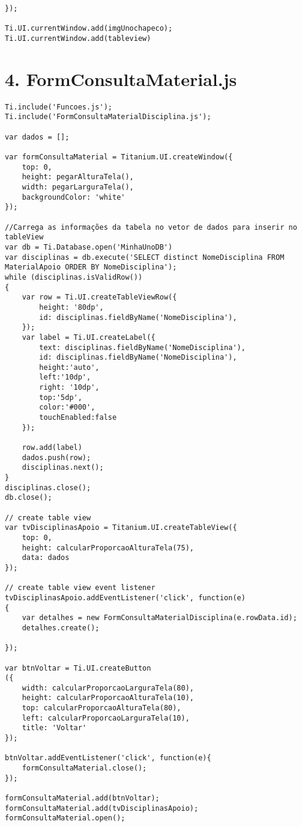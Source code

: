 \begin{lstlisting}
});

Ti.UI.currentWindow.add(imgUnochapeco);
Ti.UI.currentWindow.add(tableview)
\end{lstlisting}

\section*{4. FormConsultaMaterial.js}
\begin{lstlisting}
Ti.include('Funcoes.js');
Ti.include('FormConsultaMaterialDisciplina.js');

var dados = [];

var formConsultaMaterial = Titanium.UI.createWindow({
	top: 0,
	height: pegarAlturaTela(),
	width: pegarLarguraTela(),
	backgroundColor: 'white'
});

//Carrega as informações da tabela no vetor de dados para inserir no tableView
var db = Ti.Database.open('MinhaUnoDB')
var disciplinas = db.execute('SELECT distinct NomeDisciplina FROM MaterialApoio ORDER BY NomeDisciplina');
while (disciplinas.isValidRow())
{
	var row = Ti.UI.createTableViewRow({
		height: '80dp',
		id: disciplinas.fieldByName('NomeDisciplina'),
	});
	var label = Ti.UI.createLabel({
		text: disciplinas.fieldByName('NomeDisciplina'),
		id: disciplinas.fieldByName('NomeDisciplina'),
		height:'auto',
		left:'10dp',
		right: '10dp',
		top:'5dp',
		color:'#000',
		touchEnabled:false
	});
	
	row.add(label)
	dados.push(row);
	disciplinas.next();
}
disciplinas.close();
db.close();

// create table view
var tvDisciplinasApoio = Titanium.UI.createTableView({
	top: 0,
	height: calcularProporcaoAlturaTela(75),
	data: dados
});
 
// create table view event listener
tvDisciplinasApoio.addEventListener('click', function(e)
{
    var detalhes = new FormConsultaMaterialDisciplina(e.rowData.id);
	detalhes.create();
    
});

var btnVoltar = Ti.UI.createButton
({
	width: calcularProporcaoLarguraTela(80),
	height: calcularProporcaoAlturaTela(10),
	top: calcularProporcaoAlturaTela(80),
    left: calcularProporcaoLarguraTela(10),
    title: 'Voltar'
});

btnVoltar.addEventListener('click', function(e){
	formConsultaMaterial.close();
});
		
formConsultaMaterial.add(btnVoltar);
formConsultaMaterial.add(tvDisciplinasApoio);
formConsultaMaterial.open();
\end{lstlisting}


